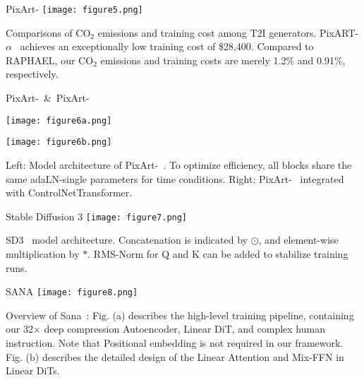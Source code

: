 \begin{refsection}
  \begin{frame}{PixArt-\alpha}
    \centering
    \texttt{[image: figure5.png]}

    {\scriptsize
    Comparisons of CO$_2$ emissions and training cost among T2I generators. PixART-$\alpha$~\parencite{chenPixArtaFastTraining2023} achieves an exceptionally low training cost of \$28,400. Compared to RAPHAEL, our CO$_2$ emissions and training costs are merely 1.2\% and 0.91\%, respectively.
    }
    \bottomleftrefs
  \end{frame}
\end{refsection}

\begin{refsection}
  \begin{frame}{PixArt-\alpha~\&~PixArt-\delta}
    \centering
    \begin{minipage}{0.3\linewidth}
      \centering
      \texttt{[image: figure6a.png]}
    \end{minipage}
    \hfill
    \begin{minipage}{0.35\linewidth}
      \centering
      \texttt{[image: figure6b.png]}
    \end{minipage}

    {\scriptsize
    Left: Model architecture of PixArt-\alpha~\parencite{chenPixArtaFastTraining2023}. To optimize efficiency, all blocks share the same adaLN-single parameters for time conditions. Right: PixArt-\delta~\parencite{chenPIXARTdFastControllable2024} integrated with ControlNetTransformer.      
    }
    \bottomleftrefs
  \end{frame}
\end{refsection}

\begin{refsection}
  \begin{frame}{Stable Diffusion 3}
    \centering
    \texttt{[image: figure7.png]}

    {\scriptsize
    SD3~\parencite{esserScalingRectifiedFlow2024a} model architecture. Concatenation is indicated by $\odot$, and element-wise multiplication by $*$. RMS-Norm for Q and K can be added to stabilize training runs.
    }
    \bottomleftrefs
  \end{frame}
\end{refsection}

\begin{refsection}
  \begin{frame}{SANA}
    \centering
    \texttt{[image: figure8.png]}

    {\scriptsize
    Overview of Sana~\parencite{xieSANAEfficientHighResolution2024}: Fig. (a) describes the high-level training pipeline, containing our 32× deep compression Autoencoder, Linear DiT, and complex human instruction. Note that Positional embedding is not required in our framework. Fig. (b) describes the detailed design of the Linear Attention and Mix-FFN in Linear DiTs.
    }
    \bottomleftrefs
  \end{frame}
\end{refsection}

